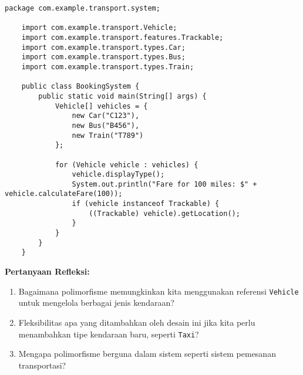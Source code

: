 \begin{lstlisting}[style=JavaStyle, caption={BookingSystem.java}]
	package com.example.transport.system;
	
	import com.example.transport.Vehicle;
	import com.example.transport.features.Trackable;
	import com.example.transport.types.Car;
	import com.example.transport.types.Bus;
	import com.example.transport.types.Train;
	
	public class BookingSystem {
		public static void main(String[] args) {
			Vehicle[] vehicles = {
				new Car("C123"),
				new Bus("B456"),
				new Train("T789")
			};
			
			for (Vehicle vehicle : vehicles) {
				vehicle.displayType();
				System.out.println("Fare for 100 miles: $" + vehicle.calculateFare(100));
				if (vehicle instanceof Trackable) {
					((Trackable) vehicle).getLocation();
				}
			}
		}
	}
\end{lstlisting}

\textbf{Pertanyaan Refleksi:}
\begin{enumerate}
	\item Bagaimana polimorfisme memungkinkan kita menggunakan referensi \texttt{Vehicle} untuk mengelola berbagai jenis kendaraan?
	\begin{tcolorbox}[colback=white, colframe=black,  width=\linewidth, height=3cm, boxrule=1pt, sharp corners]
	\end{tcolorbox}
	\item Fleksibilitas apa yang ditambahkan oleh desain ini jika kita perlu menambahkan tipe kendaraan baru, seperti \texttt{Taxi}?
	\begin{tcolorbox}[colback=white, colframe=black,  width=\linewidth, height=3cm, boxrule=1pt, sharp corners]
	\end{tcolorbox}
	\item Mengapa polimorfisme berguna dalam sistem seperti sistem pemesanan transportasi?
	\begin{tcolorbox}[colback=white, colframe=black,  width=\linewidth, height=3cm, boxrule=1pt, sharp corners]
	\end{tcolorbox}
\end{enumerate}

